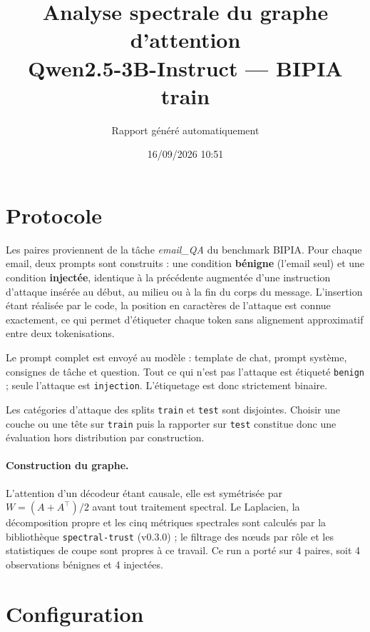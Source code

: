 \documentclass[11pt,a4paper]{article}
\title{Analyse spectrale du graphe d'attention\\Qwen2.5-3B-Instruct --- BIPIA train}
\author{Rapport généré automatiquement}
\date{16/09/2026 10:51}
\begin{document}
\maketitle

\section{Protocole}


Les paires proviennent de la tâche \emph{email\_QA} du benchmark BIPIA.
Pour chaque email, deux prompts sont construits : une condition \textbf{bénigne}
(l'email seul) et une condition \textbf{injectée}, identique à la précédente
augmentée d'une instruction d'attaque insérée au début, au milieu ou à la fin
du corps du message. L'insertion étant réalisée par le code, la position en
caractères de l'attaque est connue exactement, ce qui permet d'étiqueter chaque
token sans alignement approximatif entre deux tokenisations.

Le prompt complet est envoyé au modèle : template de chat, prompt système,
consignes de tâche et question. Tout ce qui n'est pas l'attaque est étiqueté
\texttt{benign} ; seule l'attaque est \texttt{injection}. L'étiquetage est
donc strictement binaire.

Les catégories d'attaque des splits \texttt{train} et \texttt{test} sont
disjointes. Choisir une couche ou une tête sur \texttt{train} puis la
rapporter sur \texttt{test} constitue donc une évaluation hors distribution
par construction.

\paragraph{Construction du graphe.} L'attention d'un décodeur étant causale,
elle est symétrisée par $W = (A + A^{\top})/2$ avant tout traitement spectral.
Le Laplacien, la décomposition propre et les cinq métriques spectrales sont
calculés par la bibliothèque \texttt{spectral-trust} (v0.3.0) ; le filtrage
des n\oe uds par rôle et les statistiques de coupe sont propres à ce travail.
Ce run a porté sur 4 paires, soit 4 observations bénignes et
4 injectées.


\section{Configuration}
\end{document}
